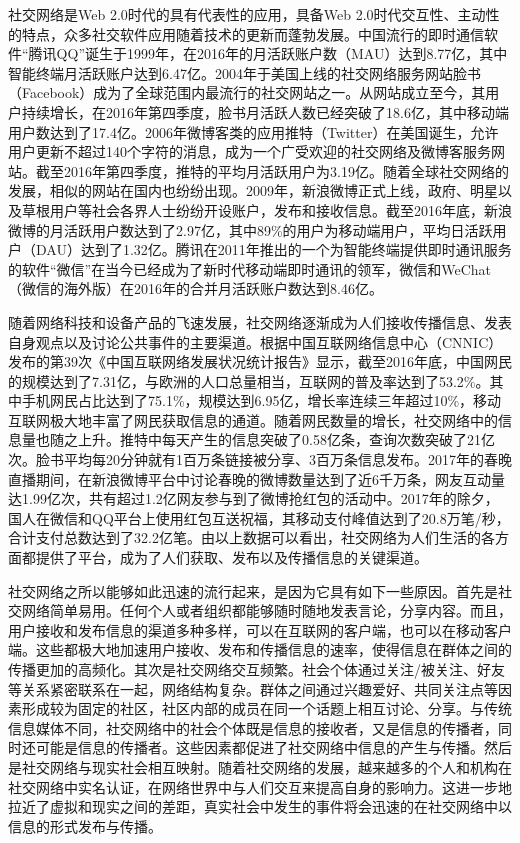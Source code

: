 社交网络是Web 2.0时代的具有代表性的应用，具备Web 2.0时代交互性、主动性的特点，众多社交软件应用随着技术的更新而蓬勃发展。中国流行的即时通信软件“腾讯QQ”诞生于1999年，在2016年的月活跃账户数（MAU）达到8.77亿，其中智能终端月活跃账户达到6.47亿。2004年于美国上线的社交网络服务网站脸书（Facebook）成为了全球范围内最流行的社交网站之一。从网站成立至今，其用户持续增长，在2016年第四季度，脸书月活跃人数已经突破了18.6亿，其中移动端用户数达到了17.4亿。2006年微博客类的应用推特（Twitter）在美国诞生，允许用户更新不超过140个字符的消息，成为一个广受欢迎的社交网络及微博客服务网站。截至2016年第四季度，推特的平均月活跃用户为3.19亿。随着全球社交网络的发展，相似的网站在国内也纷纷出现。2009年，新浪微博正式上线，政府、明星以及草根用户等社会各界人士纷纷开设账户，发布和接收信息。截至2016年底，新浪微博的月活跃用户数达到了2.97亿，其中89\%的用户为移动端用户，平均日活跃用户（DAU）达到了1.32亿。腾讯在2011年推出的一个为智能终端提供即时通讯服务的软件“微信”在当今已经成为了新时代移动端即时通讯的领军，微信和WeChat（微信的海外版）在2016年的合并月活跃账户数达到8.46亿。

随着网络科技和设备产品的飞速发展，社交网络逐渐成为人们接收传播信息、发表自身观点以及讨论公共事件的主要渠道。根据中国互联网络信息中心（CNNIC）发布的第39次《中国互联网络发展状况统计报告》显示，截至2016年底，中国网民的规模达到了7.31亿，与欧洲的人口总量相当，互联网的普及率达到了53.2\%。其中手机网民占比达到了75.1\%，规模达到6.95亿，增长率连续三年超过10\%，移动互联网极大地丰富了网民获取信息的通道。随着网民数量的增长，社交网络中的信息量也随之上升。推特中每天产生的信息突破了0.58亿条，查询次数突破了21亿次。脸书平均每20分钟就有1百万条链接被分享、3百万条信息发布。2017年的春晚直播期间，在新浪微博平台中讨论春晚的微博数量达到了近6千万条，网友互动量达1.99亿次，共有超过1.2亿网友参与到了微博抢红包的活动中。2017年的除夕，国人在微信和QQ平台上使用红包互送祝福，其移动支付峰值达到了20.8万笔/秒，合计支付总数达到了32.2亿笔。由以上数据可以看出，社交网络为人们生活的各方面都提供了平台，成为了人们获取、发布以及传播信息的关键渠道。

社交网络之所以能够如此迅速的流行起来，是因为它具有如下一些原因。首先是社交网络简单易用。任何个人或者组织都能够随时随地发表言论，分享内容。而且，用户接收和发布信息的渠道多种多样，可以在互联网的客户端，也可以在移动客户端。这些都极大地加速用户接收、发布和传播信息的速率，使得信息在群体之间的传播更加的高频化。其次是社交网络交互频繁。社会个体通过关注/被关注、好友等关系紧密联系在一起，网络结构复杂。群体之间通过兴趣爱好、共同关注点等因素形成较为固定的社区，社区内部的成员在同一个话题上相互讨论、分享。与传统信息媒体不同，社交网络中的社会个体既是信息的接收者，又是信息的传播者，同时还可能是信息的传播者。这些因素都促进了社交网络中信息的产生与传播。然后是社交网络与现实社会相互映射。随着社交网络的发展，越来越多的个人和机构在社交网络中实名认证，在网络世界中与人们交互来提高自身的影响力。这进一步地拉近了虚拟和现实之间的差距，真实社会中发生的事件将会迅速的在社交网络中以信息的形式发布与传播。

